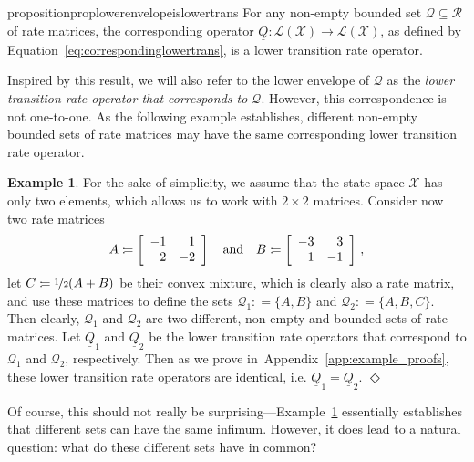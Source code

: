 \documentclass[10pt,a4paper]{paper}
\theoremstyle{definition}
\newtheorem{exmp}{Example}
\newcommand{\states}{\mathcal{X}}
\newcommand{\gambles}{\mathcal{L}}
\newcommand{\gamblesX}{\gambles(\states)}
\newcommand{\rateset}{\mathcal{Q}}
\newcommand{\lrate}{\underline{Q}}
\newcommand{\coloneqq}{:\!=}
\newcommand{\exampleend}{\hfill$\Diamond$}
\newcommand{\exampleproofref}{Appendix~\ref{app:example_proofs}}
\begin{document}
\begin{restatable}{proposition}{proplowerenvelopeislowertrans}
\label{prop:lowerenvelopeislowertrans}
For any non-empty bounded set $\rateset\subseteq\mathcal{R}$ of rate matrices, the corresponding operator $\lrate\colon\gamblesX\to\gamblesX$, as defined by Equation~\eqref{eq:correspondinglowertrans}, is a lower transition rate operator.
\end{restatable}

\noindent
Inspired by this result, we will also refer to the lower envelope of $\rateset$ as the \emph{lower transition rate operator that corresponds to $\rateset$}.  
However, this correspondence is not one-to-one. As the following example establishes, different non-empty bounded sets of rate matrices may have the same corresponding lower transition rate operator.


\begin{exmp}\label{example:different_sets_same_lower_rate}
For the sake of simplicity, we assume that the state space $\states$ has only two elements, which allows us to work with $2\times 2$ matrices. Consider now two rate matrices
\begin{equation*}
A\coloneqq\left[\begin{array}{rr}-1 & 1 \\2 & -2\end{array}\right]\quad\text{and}\quad
B\coloneqq\left[\begin{array}{rr}-3 & 3 \\1 & -1\end{array}\right]\,,
\vspace{7pt}
\end{equation*}
let $C\coloneqq \nicefrac{1}{2}(A+B)$ be their convex mixture, which is clearly also a rate matrix, and use these matrices to define the sets $\rateset_1\coloneqq\{A,B\}$ and $\rateset_2\coloneqq\{A,B,C\}$. Then clearly, $\rateset_1$ and $\rateset_2$ are two different, non-empty and bounded sets of rate matrices. Let $\lrate_1$ and $\lrate_2$ be the lower transition rate operators that correspond to $\rateset_1$ and $\rateset_2$, respectively. Then as we prove in~\exampleproofref, these lower transition rate operators are identical, i.e. $\lrate_1=\lrate_2$.
\exampleend
\end{exmp}
Of course, this should not really be surprising---Example~\ref{example:different_sets_same_lower_rate} essentially establishes that different sets can have the same infimum. However, it does lead to a natural question: what do these different sets have in common?
\end{document}
